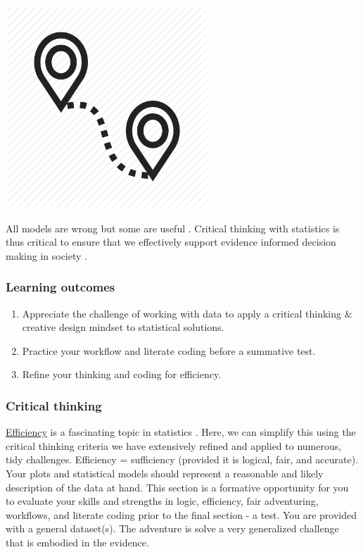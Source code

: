 \documentclass[
]{book}
\providecommand{\tightlist}{%
  \setlength{\itemsep}{0pt}\setlength{\parskip}{0pt}}
\begin{document}
\includegraphics[width=3in,height=\textheight]{./hackathon.png}

All models are wrong but some are useful \citep{RN6467, RN7258}. Critical thinking with statistics is thus critical to ensure that we effectively support evidence informed decision making in society \citep{RN6861, RN7180}.

\hypertarget{learning-outcomes-5}{%
\subsubsection*{Learning outcomes}\label{learning-outcomes-5}}

\begin{enumerate}
\def\labelenumi{\arabic{enumi}.}
\tightlist
\item
  Appreciate the challenge of working with data to apply a critical thinking \& creative design mindset to statistical solutions.\\
\item
  Practice your workflow and literate coding before a summative test.\\
\item
  Refine your thinking and coding for efficiency.
\end{enumerate}

\hypertarget{critical-thinking-4}{%
\subsubsection*{Critical thinking}\label{critical-thinking-4}}

\href{https://en.wikipedia.org/wiki/Efficiency_(statistics)}{Efficiency} is a fascinating topic in statistics \citep{RN7261, RN7260, RN7259}. Here, we can simplify this using the critical thinking criteria we have extensively refined and applied to numerous, tidy challenges. Efficiency = sufficiency (provided it is logical, fair, and accurate). Your plots and statistical models should represent a reasonable and likely description of the data at hand. This section is a formative opportunity for you to evaluate your skills and strengths in logic, efficiency, fair adventuring, workflows, and literate coding prior to the final section - a test. You are provided with a general dataset(s). The adventure is solve a very generalized challenge that is embodied in the evidence.
\end{document}
